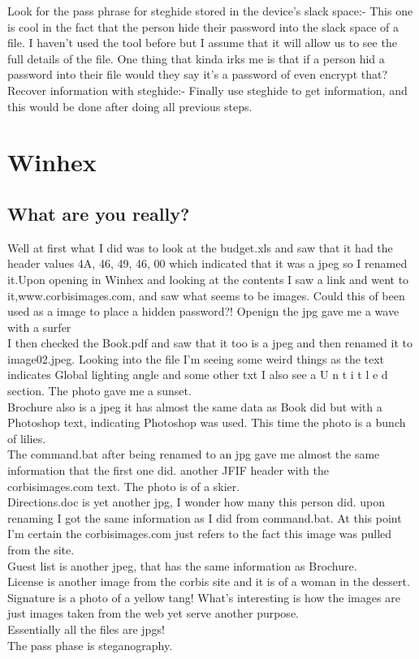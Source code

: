 \documentclass[12ptletterpaper]{paper}
\newcommand\tab[1][1cm]{\hspace*{#1}}
\begin{document}
\begin{flushleft}
		\tab Look for the pass phrase for steghide stored in the device’s slack space:- This one is cool in the fact that the person hide their password into the slack space of a file. I haven't used the tool before but I assume that it will allow us to see the full details of the file. One thing that kinda irks me is that if a person hid a password into their file would they say it's a password of even encrypt that?\\
		\tab Recover information with steghide:- Finally use steghide to get information, and this would be done after doing all previous steps.
		\section{Winhex}
		\subsection{What are you really?}
		\tab Well at first what I did was to look at the budget.xls and saw that it had the header values  4A, 46, 49, 46, 00 which indicated that it was a jpeg so I renamed it.Upon opening in Winhex and looking at the contents I saw a link and went to it,www.corbisimages.com, and saw what seems to be images. Could this of been used as a image to place a hidden password?! Openign the jpg gave me a wave with a surfer \\
		I then checked the Book.pdf and saw that it too is a jpeg and then renamed it to image02.jpeg. Looking into the file I'm seeing some weird things as the text indicates Global lighting angle and some other txt I also see a U n t i t l e d section. The photo gave me a sunset.\\
		Brochure also is a jpeg it has almost the same data as Book did but with a Photoshop text, indicating Photoshop was used. This time the photo is a bunch of lilies.\\
		The command.bat after being renamed to an jpg gave me almost the same information that the first one did. another JFIF header with the corbisimages.com text. The photo is of a skier.\\
		Directions.doc is yet another jpg, I wonder how many this person did. upon renaming I got the same information as I did from command.bat. At this point I'm certain the corbisimages.com just refers to the fact this image was pulled from the site.\\
		Guest list is another jpeg, that has the same information as Brochure.\\
		License is another image from the corbis site and it is of a woman in the dessert.\\
		Signature is a photo of  a yellow tang! What's interesting is how the images are just images taken from the web yet serve another purpose.\\
		Essentially all the files are jpgs!\\
		\tab The pass phase is steganography.\\
		
		
		
	\end{flushleft}	
\end{document}
